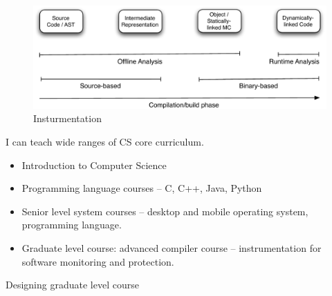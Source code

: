 \documentclass[letterpaper, 10pt]{article}
\begin{document}
\begin{small}
\begin{figure}[tb]
	\centering
	\includegraphics[width=0.5\linewidth]{figs/inst0.pdf}
	\caption{Insturmentation}
	\label{fig:decoupling}
\end{figure}

I can teach wide ranges of CS core curriculum.
\begin{itemize}
\item Introduction to Computer Science
\item Programming language courses -- C, C++, Java, Python 
\item Senior level system courses -- desktop and mobile operating system,
  programming language.
\item Graduate level course: advanced compiler course -- instrumentation for
  software monitoring and protection.
\end{itemize}

Designing graduate level course 

\end{small}
\end{document}
